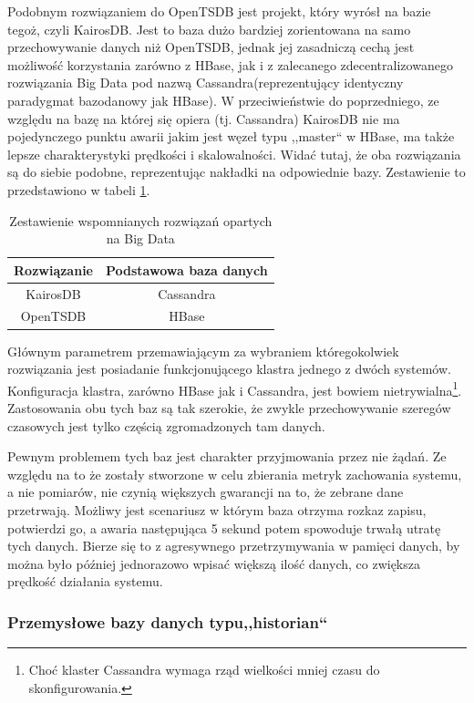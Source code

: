 \documentclass[a4paper,polish,12pt,twoside]{article}
\begin{document}
Podobnym rozwiązaniem do OpenTSDB jest projekt, który wyrósł na bazie tegoż, czyli KairosDB. Jest to baza dużo bardziej zorientowana na samo przechowywanie danych niż OpenTSDB, jednak jej zasadniczą cechą jest możliwość korzystania zarówno z HBase, jak i z zalecanego zdecentralizowanego rozwiązania Big Data pod nazwą Cassandra\cite{Lakshman:2010:CDS:1773912.1773922}(reprezentujący identyczny paradygmat bazodanowy jak HBase). W przeciwieństwie do poprzedniego, ze względu na bazę na której się opiera (tj. Cassandra) KairosDB nie ma pojedynczego punktu awarii jakim jest węzeł typu ,,master`` w HBase, ma także lepsze charakterystyki prędkości i skalowalności\cite{cassandra:benchmark}. Widać tutaj, że oba rozwiązania są do siebie podobne, reprezentując nakładki na odpowiednie bazy. Zestawienie to przedstawiono w tabeli \ref{tab:kairos_open}.

\begin{table} \centering \begin{tabular}{|c|c|}
\hline Rozwiązanie & Podstawowa baza danych\\ \hline
KairosDB & Cassandra \\
OpenTSDB & HBase \\
\hline \end{tabular}
\caption{Zestawienie wspomnianych rozwiązań opartych na Big Data} \label{tab:kairos_open} \end{table}

Głównym parametrem przemawiającym za wybraniem któregokolwiek rozwiązania jest posiadanie funkcjonującego klastra jednego z dwóch systemów. Konfiguracja klastra, zarówno HBase jak i Cassandra, jest bowiem nietrywialna\footnote{Choć klaster Cassandra wymaga rząd wielkości mniej czasu do skonfigurowania.}. Zastosowania obu tych baz są tak szerokie, że zwykle przechowywanie szeregów czasowych jest tylko częścią zgromadzonych tam danych.

Pewnym problemem tych baz jest charakter przyjmowania przez nie żądań. Ze względu na to że zostały stworzone w celu zbierania metryk zachowania systemu, a nie pomiarów, nie czynią większych gwarancji na to, że zebrane dane przetrwają. Możliwy jest scenariusz w którym baza otrzyma rozkaz zapisu, potwierdzi go, a awaria następująca 5 sekund potem spowoduje trwałą utratę tych danych. Bierze się to z agresywnego przetrzymywania w pamięci danych, by można było później jednorazowo wpisać większą ilość danych, co zwiększa prędkość działania systemu.

	\subsubsection{Przemysłowe bazy danych typu,,historian``}
\end{document}
